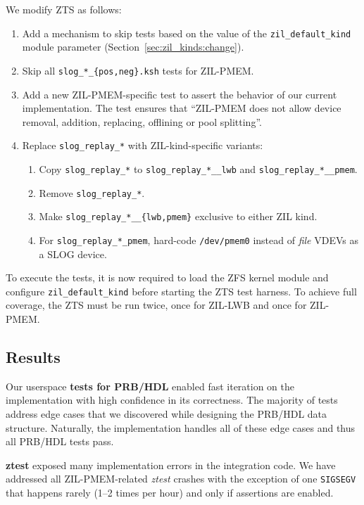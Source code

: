 \documentclass[12pt,a4paper,twoside]{book}
\begin{document}
We modify ZTS as follows:
\begin{enumerate}[noitemsep]
    \item Add a mechanism to skip tests based on the value of the \lstinline{zil_default_kind} module parameter (Section~\ref{sec:zil_kinds:change}).
    \item Skip all \lstinline|slog_*_{pos,neg}.ksh| tests for ZIL-PMEM.
    \item Add a new ZIL-PMEM-specific test to assert the behavior of our current implementation.
        The test ensures that ``ZIL-PMEM does not allow device removal, addition, replacing, offlining or pool splitting''.
    \item Replace \lstinline{slog_replay_*} with ZIL-kind-specific variants:
        \begin{enumerate}
            \item Copy \lstinline{slog_replay_*} to \lstinline{slog_replay_*__lwb} and \lstinline{slog_replay_*__pmem}.
            \item Remove \lstinline{slog_replay_*}.
            \item Make \lstinline|slog_replay_*__{lwb,pmem}| exclusive to either ZIL kind.
            \item For \lstinline{slog_replay_*_pmem}, hard-code \lstinline{/dev/pmem0} instead of \textit{file} VDEVs as a SLOG device.
        \end{enumerate}
\end{enumerate}
To execute the tests, it is now required to load the ZFS kernel module and configure \lstinline{zil_default_kind} before starting the ZTS test harness.
To achieve full coverage, the ZTS must be run twice, once for ZIL-LWB and once for ZIL-PMEM.

\subsection{Results}\label{sec:eval:correctness:results}

Our userspace \textbf{tests for PRB/HDL} enabled fast iteration on the implementation with high confidence in its correctness.
The majority of tests address edge cases that we discovered while designing the PRB/HDL data structure.
Naturally, the implementation handles all of these edge cases and thus all PRB/HDL tests pass.

\textbf{ztest} exposed many implementation errors in the integration code.
We have addressed all ZIL-PMEM-related \textit{ztest} crashes with the exception of one \lstinline{SIGSEGV} that happens rarely (1--2 times per hour) and only if assertions are enabled.
\end{document}
